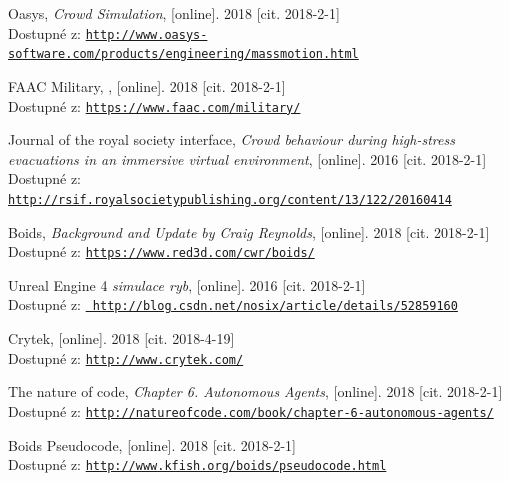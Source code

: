 \documentclass[czech,public,dept460,male,cpdeclaration]{diploma}
\begin{document}
\newpage

\begin{thebibliography}{99}
	
	 Oasys,
	\textit{Crowd Simulation}, [online]. 2018 [cit. 2018-2-1]\\
	Dostupné z: \href{http://www.oasys-software.com/products/engineering/massmotion.html}{\texttt{http://www.oasys-software.com/products/engineering/massmotion.html}}
	
	 FAAC Military,
	, [online]. 2018 [cit. 2018-2-1]\\
	Dostupné z: \href{https://www.faac.com/military/}{\texttt{https://www.faac.com/military/}}
	
	 Journal of the royal society interface, 
		\textit{Crowd behaviour during high-stress evacuations in an immersive virtual environment}, [online]. 2016 [cit. 2018-2-1]\\
		Dostupné z: \href{http://rsif.royalsocietypublishing.org/content/13/122/20160414}{\texttt{http://rsif.royalsocietypublishing.org/content/13/122/20160414}}
	
	 Boids, 
		\textit{Background and Update by Craig Reynolds}, [online]. 2018 [cit. 2018-2-1]\\
		Dostupné z: \href{https://www.red3d.com/cwr/boids/}{\texttt{https://www.red3d.com/cwr/boids/}}
	
	 Unreal Engine 4 \textit{simulace ryb}, [online]. 2016 [cit. 2018-2-1]\\
		Dostupné z: \href{		http://blog.csdn.net/nosix/article/details/52859160}{\texttt{		http://blog.csdn.net/nosix/article/details/52859160}}
	
	 Crytek, [online]. 2018 [cit. 2018-4-19]\\
	Dostupné z: \href{http://www.crytek.com/}{\texttt{http://www.crytek.com/}}
	
	 The nature of code, 
		\textit{Chapter 6. Autonomous Agents}, [online]. 2018 [cit. 2018-2-1]\\
		Dostupné z: \href{http://natureofcode.com/book/chapter-6-autonomous-agents/}{\texttt{http://natureofcode.com/book/chapter-6-autonomous-agents/}}

	 Boids Pseudocode, 
		[online]. 2018 [cit. 2018-2-1]\\
		Dostupné z: \href{http://www.kfish.org/boids/pseudocode.html}{\texttt{http://www.kfish.org/boids/pseudocode.html}}
		

\end{thebibliography}
\end{document}
